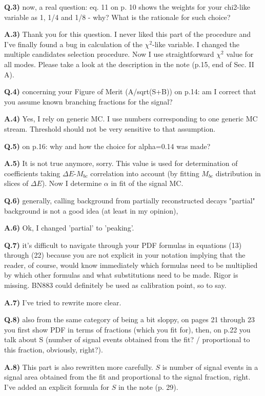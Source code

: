 \documentclass[a4paper,12pt]{article}
\begin{document}
{\bf Q.3)} now, a real question: eq. 11 on p. 10 shows the weights for your chi2-like variable as 1, 1/4 and 1/8 - why? What is the rationale for such choice?

{\bf A.3)} Thank you for this question. I never liked this part of the procedure and I've finally found a bug in calculation of the $\chi^2$-like variable. I changed the multiple candidates selection procedure. Now I use straightforward $\chi^2$ value for all modes. Please take a look at the description in the note (p.15, end of Sec. II A).

{\bf Q.4)} concerning your Figure of Merit (A/sqrt(S+B)) on p.14: am I correct that you assume known branching fractions for the signal?

{\bf A.4)} Yes, I rely on generic MC. I use numbers corresponding to one generic MC stream. Threshold should not be very sensitive to that assumption.

{\bf Q.5)} on p.16:  why and how the choice for alpha=0.14 was made?

{\bf A.5)} It is not true anymore, sorry. This value is used for determination of coefficients taking $\Delta E$-$M_{bc}$ correlation  into account (by fitting $M_{bc}$ distribution in slices of $\Delta E$). Now I determine $\alpha$ in fit of the signal MC.

{\bf Q.6)} generally, calling background from partially reconstructed decays "partial" background is not a good idea (at least in my opinion),

{\bf A.6)} Ok, I changed 'partial' to 'peaking'.

{\bf Q.7)} it's difficult to navigate through your PDF formulas in equations (13) through (22) because you are not explicit in your notation implying that the reader, of course, would know immediately which formulas need to be multiplied by which other formulas and what substitutions need to be made. Rigor is missing. BN883 could definitely be used as calibration point, so to say. 

{\bf A.7)} I've tried to rewrite more clear.

{\bf Q.8)} also from the same category of being a bit sloppy, on pages 21 through 23 you first show PDF in terms of fractions (which you fit for), then, on p.22 you talk about S (number of signal events obtained from the fit? / proportional to this fraction, obviously, right?). 

{\bf A.8)} This part is also rewritten more carefully. $S$ is number of signal events in a signal area obtained from the fit and proportional to the signal fraction, right. I've added an explicit formula for $S$ in the note (p. 29).
\end{document}
